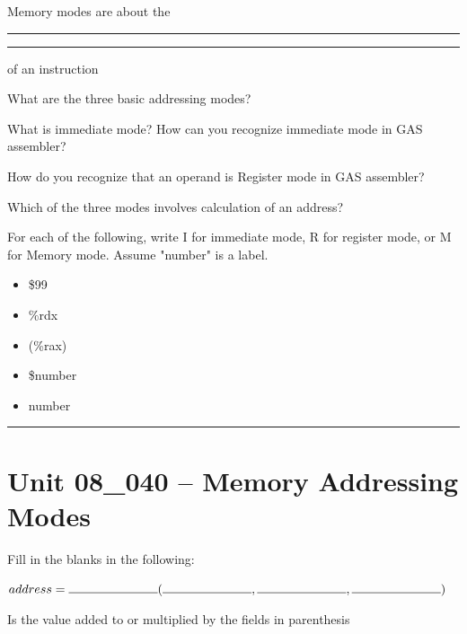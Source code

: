 \documentclass[letterpaper,12pt]{exam}
\newcommand{\unit}{Unit 08}
\begin{document}
\begin{questions}
\begin{samepage}
    \question Memory modes are about the \rule{1cm}{0.15mm}\rule{1cm}{0.15mm} of an instruction
    \vspace{5mm}
\end{samepage}
\par
  \begin{samepage}
     \question What are the three basic addressing modes?
     \vspace{5mm}
 \end{samepage}
 \par


\begin{samepage}
    \question What is immediate mode?  How can you recognize immediate mode in GAS assembler?
    \vspace{5mm}
\end{samepage}
\par
 \begin{samepage}
     \question How do you recognize that an operand is Register mode in GAS assembler?
     \vspace{5mm}
 \end{samepage}
 \par
\begin{samepage}
    \question Which of the three modes involves calculation of an address?
    \vspace{5mm}
\end{samepage}
\par
\begin{samepage}
    \question For each of the following, write I for immediate mode, R for register mode, or M for Memory mode.  Assume "number" is a label.
\begin{itemize}
    \item \$99
    \item \%rdx
    \item (\%rax)
    \item \$number
    \item number
\end{itemize}
    \vspace{5mm}
\end{samepage}
    \rule{0.5\textwidth}{.4pt} %
\section*{\unit\_040 -- Memory Addressing Modes}
\begin{samepage}
    \question Fill in the blanks in the following:
    \par
    $address = \rule{2.5cm}{0.15mm}(\rule{2.5cm}{0.15mm},\rule{2.5cm}{0.15mm},\rule{2.5cm}{0.15mm})$
    \vspace{5mm}
\end{samepage}
\par
\begin{samepage}
    \question Is the value added to or multiplied by the fields in parenthesis
    \vspace{5mm}
\end{samepage}
\par
 

\end{questions}
\end{document}
